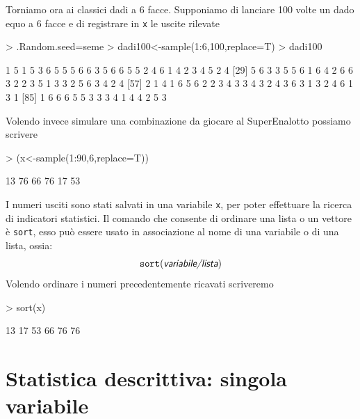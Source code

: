 \documentclass[onecolumn,12pt]{book}
\newcommand{\varia}[1]{\textsl{\textsf{#1}}}
\begin{document}
Torniamo ora ai classici dadi a 6 facce.
Supponiamo di lanciare 100 volte un dado equo a 6 facce e di registrare in \texttt{x}
le uscite rilevate
\begin{Schunk}
\begin{Sinput}
> .Random.seed=seme
> dadi100<-sample(1:6,100,replace=T)
> dadi100
\end{Sinput}
\begin{Soutput}
  [1] 1 5 1 5 3 6 5 5 5 6 6 3 5 6 6 5 5 2 4 6 1 4 2 3 4 5 2 4
 [29] 5 6 3 3 5 5 6 1 6 4 2 6 6 3 2 2 3 5 1 3 3 2 5 6 3 4 2 4
 [57] 2 1 4 1 6 5 6 2 2 3 4 3 3 4 3 2 4 3 6 3 1 3 2 4 6 1 3 1
 [85] 1 6 6 6 5 5 3 3 3 4 1 4 4 2 5 3
\end{Soutput}
\end{Schunk}
Volendo invece simulare una combinazione da giocare al SuperEnalotto possiamo scrivere
\begin{Schunk}
\begin{Sinput}
> (x<-sample(1:90,6,replace=T))
\end{Sinput}
\begin{Soutput}
[1] 13 76 66 76 17 53
\end{Soutput}
\end{Schunk}
I numeri usciti sono stati salvati  in una variabile \texttt{x}, per poter effettuare la ricerca di indicatori statistici.
Il comando che consente di ordinare una lista o un vettore \`e \texttt{sort}, esso pu\`o essere usato in associazione al nome di una variabile o di una lista, ossia:
\begin{equation}\texttt{sort}(\varia{variabile/lista})\end{equation}
Volendo ordinare i numeri precedentemente ricavati scriveremo
\begin{Schunk}
\begin{Sinput}
> sort(x)
\end{Sinput}
\begin{Soutput}
[1] 13 17 53 66 76 76
\end{Soutput}
\end{Schunk}



\section{Statistica descrittiva: singola variabile}
\end{document}
